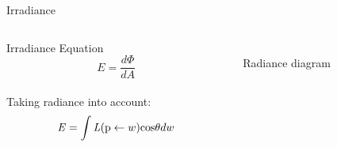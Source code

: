 \documentclass[10pt,compress,professionalfont]{beamer}
\begin{document}
\begin{frame}{Irradiance}

    \begin{columns}
        \begin{column}{0.5\textwidth}
                \begin{block}{Irradiance Equation}
                    \[
                    E = \frac{d\Phi}{dA}
                    \]\\
                    \vspace{4mm}
                    {\centering Taking radiance into account:\\}
                    \[
                        \mathit{E} = \int\mathit{L}(\textup{p} \leftarrow w)\textup{cos}\theta dw
                    \]
                \end{block}
        \end{column}
        \begin{column}{0.5\textwidth}
            \vspace{-5mm}
            {\centering
            \includegraphics[width=\textwidth]{../img/diag/radiance.pdf}\\
            \scriptsize Radiance diagram\\
            }
        \end{column}
    \end{columns}



\end{frame}
\end{document}
